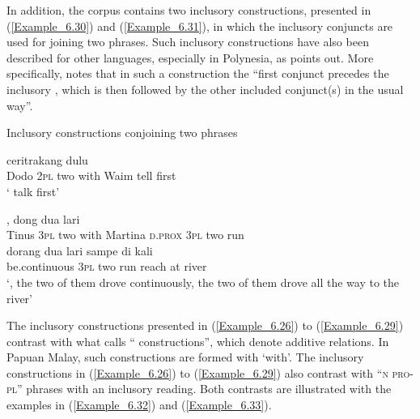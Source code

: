 In addition, the corpus contains two inclusory  constructions, presented in (\ref{Example_6.30}) and (\ref{Example_6.31}), in which the inclusory conjuncts are used for joining two  phrases. Such inclusory  constructions have also been described for other languages, especially in Polynesia, as \citet{Haspelmath.2007c} points out. More specifically, \citet[35]{Haspelmath.2007c} notes that in such a construction the “first conjunct precedes the inclusory , which is then followed by the other included conjunct(s) in the usual way”.



\begin{styleExampleTitle}
Inclusory  constructions conjoining two  phrases
\end{styleExampleTitle}

\ea
\label{Example_6.30}
 {} {} {} {} {ceritrakang} {dulu}\\ %
 Dodo  \textsc{2pl}  two  with  Waim  tell  first\\

\glt
‘ talk first’ \textstyleExampleSource{[081011-001-Cv.0001]}
\z

\ea
\label{Example_6.31}
 {{}} {} {{}} {{}} {{,}} {dong} {dua} {lari}\\ %
 Tinus  {\textsc{3pl}}  two  {with}  {Martina}  {\textsc{d.prox}}  \textsc{3pl}  two  run\\
  {dorang}  dua  {lari}  {sampe}  di  {kali}\\
 {be.continuous}  {\textsc{3pl}}  two  {run}  {reach}  at  {river}\\

\glt
‘, the two of them drove continuously, the two of them drove all the way to the river’ \textstyleExampleSource{[081015-005-NP.0011]}
\z



The inclusory  constructions presented in (\ref{Example_6.26}) to (\ref{Example_6.29}) contrast with what \citet[33]{Haspelmath.2007c} calls “  constructions”, which denote additive relations. In Papuan Malay, such  constructions are formed with   ‘with’. The inclusory  constructions in (\ref{Example_6.26}) to (\ref{Example_6.29}) also contrast with ``\textsc{n} \textsc{pro-pl}''  phrases with an  inclusory reading. Both contrasts are illustrated with the examples in (\ref{Example_6.32}) and (\ref{Example_6.33}).



